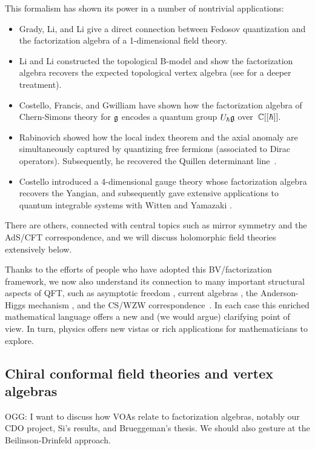 \documentclass[11pt]{amsart}
\def\owen#1{{\textcolor{green!65!black}{OGG: {#1}}}}
\begin{document}
This formalism has shown its power in a number of nontrivial applications:
\begin{itemize}
\item Grady, Li, and Li \cite{GLL} give a direct connection between Fedosov quantization and the factorization algebra of a 1-dimensional field theory.
\item Li and Li \cite{LiLi} constructed the topological B-model and show the factorization algebra recovers the expected topological vertex algebra (see \cite{LiVOA} for a deeper treatment).
\item Costello, Francis, and Gwilliam \cite{CFG} have shown how the factorization algebra of Chern-Simons theory for $\mathfrak g$ encodes a quantum group $U_\hbar \mathfrak g$ over~$\mathbb C[[\hbar]]$.
\item Rabinovich \cite{RabAxial} showed how the local index theorem and the axial anomaly are simultaneously captured by quantizing free fermions (associated to Dirac operators). Subsequently, he recovered the Quillen determinant line~\cite{RabDet}.
\item Costello \cite{CosYangian} introduced a 4-dimensional gauge theory whose factorization algebra recovers the Yangian,
and subsequently gave extensive applications to quantum integrable systems with Witten and Yamazaki \cite{CWY1,CWY2, CY}.
\end{itemize}
There are others, connected with central topics such as mirror symmetry and the AdS/CFT correspondence, 
and we will discuss holomorphic field theories extensively below.

Thanks to the efforts of people who have adopted this BV/factorization framework,
we now also understand its connection to many important structural aspects of QFT, 
such as asymptotic freedom \cite{EWY}, current algebras \cite{GWcurr}, the Anderson-Higgs mechanism \cite{EG}, and the CS/WZW correspondence~\cite{GRW, CosDimGai}.
In each case this enriched mathematical language offers a new and (we would argue) clarifying point of view.
In turn, physics offers new vistas or rich applications for mathematicians to explore.

\subsection{Chiral conformal field theories and vertex algebras}

\owen{I want to discuss how VOAs relate to factorization algebras, notably our CDO project, Si's results, and Brueggeman's thesis. We should also gesture at the Beilinson-Drinfeld approach.}
\end{document}
